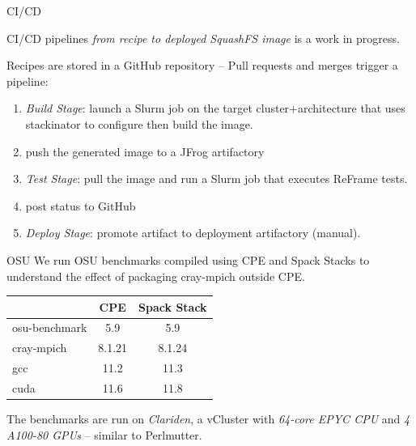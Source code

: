 \documentclass[aspectratio=43]{beamer}
\begin{document}
\begin{frame}[fragile]{CI/CD}
    \begin{center}
    CI/CD pipelines \emph{from recipe to deployed SquashFS image} is a work in progress.
    \end{center}

    \vspace{10pt}

    Recipes are stored in a GitHub repository -- Pull requests and merges trigger a pipeline:
    \begin{enumerate}
        \item \emph{\sc Build Stage}: launch a Slurm job on the target cluster+architecture that uses stackinator to configure then build the image.
        \item push the generated image to a JFrog artifactory
        \item \emph{\sc Test Stage}: pull the image and run a Slurm job that executes ReFrame tests.
        \item post status to GitHub
        \item \emph{\sc Deploy Stage}: promote artifact to deployment artifactory (manual).
    \end{enumerate}
\end{frame}


\begin{frame}[fragile]{OSU}
    We run OSU benchmarks compiled using CPE and Spack Stacks to understand the effect of packaging cray-mpich outside CPE.
\begin{center}
    \begin{tabular}{l |c  c }
                      & CPE   & Spack Stack \\
          \hline
        osu-benchmark & 5.9   & 5.9       \\
        cray-mpich    & 8.1.21& 8.1.24    \\
        gcc           & 11.2  & 11.3      \\
        cuda          & 11.6  & 11.8      \\
    \end{tabular}
\end{center}

    The benchmarks are run on \emph{Clariden}, a vCluster with \emph{64-core EPYC CPU} and  \emph{4 A100-80 GPUs} -- similar to Perlmutter.

\end{frame}
\end{document}
